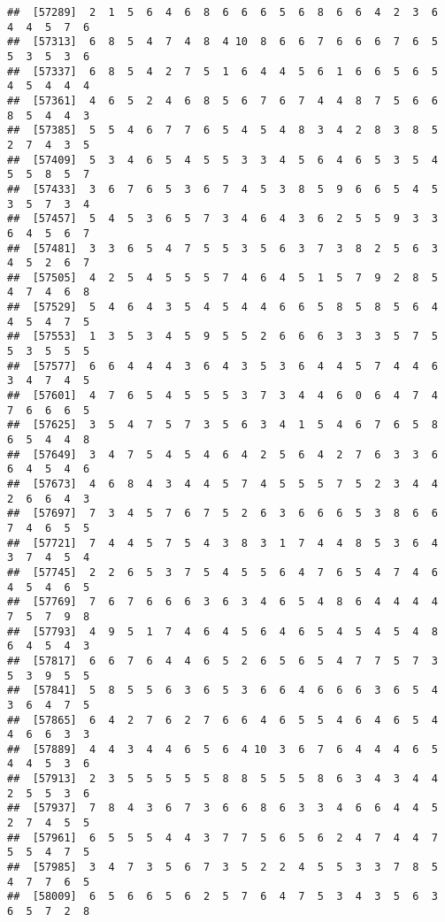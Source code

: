 \documentclass[
]{book}
\begin{document}
\begin{verbatim}
##  [57289]  2  1  5  6  4  6  8  6  6  6  5  6  8  6  6  4  2  3  6  4  4  5  7  6
##  [57313]  6  8  5  4  7  4  8  4 10  8  6  6  7  6  6  6  7  6  5  5  3  5  3  6
##  [57337]  6  8  5  4  2  7  5  1  6  4  4  5  6  1  6  6  5  6  5  4  5  4  4  4
##  [57361]  4  6  5  2  4  6  8  5  6  7  6  7  4  4  8  7  5  6  6  8  5  4  4  3
##  [57385]  5  5  4  6  7  7  6  5  4  5  4  8  3  4  2  8  3  8  5  2  7  4  3  5
##  [57409]  5  3  4  6  5  4  5  5  3  3  4  5  6  4  6  5  3  5  4  5  5  8  5  7
##  [57433]  3  6  7  6  5  3  6  7  4  5  3  8  5  9  6  6  5  4  5  3  5  7  3  4
##  [57457]  5  4  5  3  6  5  7  3  4  6  4  3  6  2  5  5  9  3  3  6  4  5  6  7
##  [57481]  3  3  6  5  4  7  5  5  3  5  6  3  7  3  8  2  5  6  3  4  5  2  6  7
##  [57505]  4  2  5  4  5  5  5  7  4  6  4  5  1  5  7  9  2  8  5  4  7  4  6  8
##  [57529]  5  4  6  4  3  5  4  5  4  4  6  6  5  8  5  8  5  6  4  4  5  4  7  5
##  [57553]  1  3  5  3  4  5  9  5  5  2  6  6  6  3  3  3  5  7  5  5  3  5  5  5
##  [57577]  6  6  4  4  4  3  6  4  3  5  3  6  4  4  5  7  4  4  6  3  4  7  4  5
##  [57601]  4  7  6  5  4  5  5  5  3  7  3  4  4  6  0  6  4  7  4  7  6  6  6  5
##  [57625]  3  5  4  7  5  7  3  5  6  3  4  1  5  4  6  7  6  5  8  6  5  4  4  8
##  [57649]  3  4  7  5  4  5  4  6  4  2  5  6  4  2  7  6  3  3  6  6  4  5  4  6
##  [57673]  4  6  8  4  3  4  4  5  7  4  5  5  5  7  5  2  3  4  4  2  6  6  4  3
##  [57697]  7  3  4  5  7  6  7  5  2  6  3  6  6  6  5  3  8  6  6  7  4  6  5  5
##  [57721]  7  4  4  5  7  5  4  3  8  3  1  7  4  4  8  5  3  6  4  3  7  4  5  4
##  [57745]  2  2  6  5  3  7  5  4  5  5  6  4  7  6  5  4  7  4  6  4  5  4  6  5
##  [57769]  7  6  7  6  6  6  3  6  3  4  6  5  4  8  6  4  4  4  4  7  5  7  9  8
##  [57793]  4  9  5  1  7  4  6  4  5  6  4  6  5  4  5  4  5  4  8  6  4  5  4  3
##  [57817]  6  6  7  6  4  4  6  5  2  6  5  6  5  4  7  7  5  7  3  5  3  9  5  5
##  [57841]  5  8  5  5  6  3  6  5  3  6  6  4  6  6  6  3  6  5  4  3  6  4  7  5
##  [57865]  6  4  2  7  6  2  7  6  6  4  6  5  5  4  6  4  6  5  4  4  6  6  3  3
##  [57889]  4  4  3  4  4  6  5  6  4 10  3  6  7  6  4  4  4  6  5  4  4  5  3  6
##  [57913]  2  3  5  5  5  5  5  8  8  5  5  5  8  6  3  4  3  4  4  2  5  5  3  6
##  [57937]  7  8  4  3  6  7  3  6  6  8  6  3  3  4  6  6  4  4  5  2  7  4  5  5
##  [57961]  6  5  5  5  4  4  3  7  7  5  6  5  6  2  4  7  4  4  7  5  5  4  7  5
##  [57985]  3  4  7  3  5  6  7  3  5  2  2  4  5  5  3  3  7  8  5  4  7  7  6  5
##  [58009]  6  5  6  6  5  6  2  5  7  6  4  7  5  3  4  3  5  6  3  6  5  7  2  8

\end{verbatim}
\end{document}

